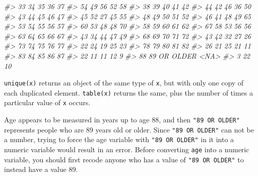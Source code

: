 \documentclass[
]{book}
\newenvironment{Shaded}{\begin{snugshade}}{\end{snugshade}}
\newcommand{\CommentTok}[1]{\textcolor[rgb]{0.56,0.35,0.01}{\textit{#1}}}
\begin{document}
\begin{Shaded}
\begin{Highlighting}[]
\CommentTok{\#\textgreater{}          33          34          35          36          37 }
\CommentTok{\#\textgreater{}          54          49          56          52          58 }
\CommentTok{\#\textgreater{}          38          39          40          41          42 }
\CommentTok{\#\textgreater{}          44          42          46          36          50 }
\CommentTok{\#\textgreater{}          43          44          45          46          47 }
\CommentTok{\#\textgreater{}          45          52          27          45          55 }
\CommentTok{\#\textgreater{}          48          49          50          51          52 }
\CommentTok{\#\textgreater{}          46          41          48          49          65 }
\CommentTok{\#\textgreater{}          53          54          55          56          57 }
\CommentTok{\#\textgreater{}          60          53          48          48          70 }
\CommentTok{\#\textgreater{}          58          59          60          61          62 }
\CommentTok{\#\textgreater{}          67          58          53          56          56 }
\CommentTok{\#\textgreater{}          63          64          65          66          67 }
\CommentTok{\#\textgreater{}          43          34          44          47          49 }
\CommentTok{\#\textgreater{}          68          69          70          71          72 }
\CommentTok{\#\textgreater{}          43          42          32          27          26 }
\CommentTok{\#\textgreater{}          73          74          75          76          77 }
\CommentTok{\#\textgreater{}          22          24          19          25          23 }
\CommentTok{\#\textgreater{}          78          79          80          81          82 }
\CommentTok{\#\textgreater{}          26          21          25          21          11 }
\CommentTok{\#\textgreater{}          83          84          85          86          87 }
\CommentTok{\#\textgreater{}          22          11          11          12           9 }
\CommentTok{\#\textgreater{}          88 89 OR OLDER        \textless{}NA\textgreater{} }
\CommentTok{\#\textgreater{}           3          22          10}
\end{Highlighting}
\end{Shaded}

\texttt{unique(x)} returns an object of the same type of \texttt{x}, but with only one copy of each duplicated element. \texttt{table(x)} returns the same, plus the number of times a particular value of \texttt{x} occurs.

Age appears to be measured in years up to age 88, and then \texttt{"89\ OR\ OLDER"} represents people who are 89 years old or older. Since \texttt{"89\ OR\ OLDER"} can not be a number, trying to force the age variable with \texttt{"89\ OR\ OLDER"} in it into a numeric variable would result in an error. Before converting \texttt{age} into a numeric variable, you should first recode anyone who has a value of \texttt{"89\ OR\ OLDER"} to instead have a value 89.
\end{document}
